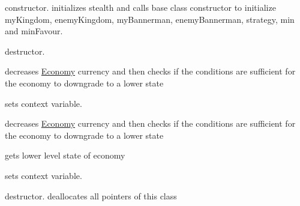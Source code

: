 \begin{DoxyRefList}
\item[Member \mbox{\hyperlink{class_battle_field_a55cdd1fe446cff45e718103ce14d3085}{Battle\+Field\+::Battle\+Field}} (int min, int min\+Favour)]\label{todo__todo000007}%
%
constructor. initializes stealth and calls base class constructor to initialize my\+Kingdom, enemy\+Kingdom, my\+Bannerman, enemy\+Bannerman, strategy, min and min\+Favour.  
\item[Member \mbox{\hyperlink{class_battle_field_adf5797b1520be6502b828196690b9348}{Battle\+Field\+::$\sim$\+Battle\+Field}} ()]\label{todo__todo000009}%
%
destructor.  
\item[Member \mbox{\hyperlink{class_failed_state_afaaef228a607bb585a980642985d18a2}{Failed\+State\+::decrease\+Currency}} ()]\label{todo__todo000011}%
%
decreases \mbox{\hyperlink{class_economy}{Economy}} currency and then checks if the conditions are sufficient for the economy to downgrade to a lower state  
\item[Member \mbox{\hyperlink{class_failed_state_acc9cac035280bef2ba36d7049b422956}{Failed\+State\+::set\+Context}} (\mbox{\hyperlink{class_economy}{Economy}} $\ast$context)]\label{todo__todo000010}%
%
sets context variable.  
\item[Member \mbox{\hyperlink{class_healthy_state_a5f75e1935e20ed34b73d259a2324e4f9}{Healthy\+State\+::decrease\+Currency}} ()]\label{todo__todo000013}%
%
decreases \mbox{\hyperlink{class_economy}{Economy}} currency and then checks if the conditions are sufficient for the economy to downgrade to a lower state  
\item[Member \mbox{\hyperlink{class_healthy_state_a97583e0f477b87971b3a586ef1ba89e6}{Healthy\+State\+::get\+Demotion\+State}} ()]\label{todo__todo000014}%
%
gets lower level state of economy  
\item[Member \mbox{\hyperlink{class_healthy_state_abdfa8ce236a9766bac7dd8ed3bf316e2}{Healthy\+State\+::set\+Context}} (\mbox{\hyperlink{class_economy}{Economy}} $\ast$context)]\label{todo__todo000012}%
%
sets context variable.  
\item[Member \mbox{\hyperlink{class_kingdom_a434e87f15f449ee199ab3a1ddfe2f0f6}{Kingdom\+::$\sim$\+Kingdom}} ()]\label{todo__todo000015}%
%
destructor. deallocates all pointers of this class  
\item[Member \mbox{\hyperlink{class_siege_ae8e9de64c3a659bf32bb35ad4cbcbc2f}{Siege\+::attack}} (\mbox{\hyperlink{class_bannerman}{Bannerman}} $\ast$my\+Bannerman, \mbox{\hyperlink{class_bannerman}{Bannerman}} $\ast$enemy\+Bannerman)]\label{todo__todo000017}%

\end{DoxyRefList}
